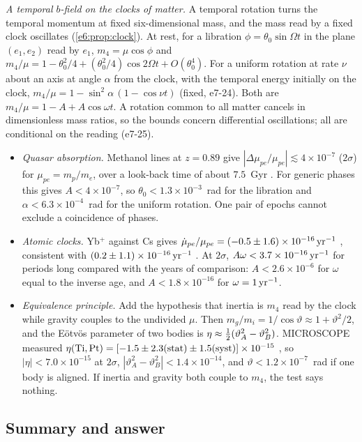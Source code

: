 \emph{A temporal $b$-field on the clocks of matter.} A temporal rotation turns the temporal momentum at fixed six-dimensional mass, and the mass
read by a fixed clock oscillates (\cref{e6:prop:clock}). At rest, for a libration $\phi=\theta_0\sin\Omega t$ in the plane $(e_1,e_2)$ read by
$e_1$, $m_4=\mu\cos\phi$ and $m_4/\mu=1-\theta_0^2/4+(\theta_0^2/4)\cos2\Omega t+O(\theta_0^4)$. For a uniform rotation at rate $\nu$ about an axis at
angle $\alpha$ from the clock, with the temporal energy initially on the clock, $m_4/\mu=1-\sin^2\alpha\,(1-\cos\nu t)$ (fixed, e7-24). Both are
$m_4/\mu=1-A+A\cos\omega t$. A rotation common to all matter cancels in dimensionless mass ratios, so the bounds concern differential
oscillations; all are conditional on the reading (e7-25).
\begin{itemize}
\item \emph{Quasar absorption.} Methanol lines at $z=0.89$ give $|\Delta\mu_{pe}/\mu_{pe}|\lesssim4\times10^{-7}$ ($2\sigma$) for
$\mu_{pe}=m_p/m_e$, over a look-back time of about $7.5$~Gyr \cite{Kanekar15}. For generic phases this gives $A<4\times10^{-7}$, so
$\theta_0<1.3\times10^{-3}$~rad for the libration and $\alpha<6.3\times10^{-4}$~rad for the uniform rotation. One pair of epochs cannot exclude a
coincidence of phases.
\item \emph{Atomic clocks.} Yb$^+$ against Cs gives $\dot\mu_{pe}/\mu_{pe}=(-0.5\pm1.6)\times10^{-16}\,{\rm yr^{-1}}$ \cite{Huntemann14}, consistent with
$(0.2\pm1.1)\times10^{-16}\,{\rm yr^{-1}}$ \cite{Godun14}. At $2\sigma$, $A\omega<3.7\times10^{-16}\,{\rm yr^{-1}}$ for periods long compared with the
years of comparison: $A<2.6\times10^{-6}$ for $\omega$ equal to the inverse age, and $A<1.8\times10^{-16}$ for $\omega=1\,{\rm yr^{-1}}$.
\item \emph{Equivalence principle.} Add the hypothesis that inertia is $m_4$ read by the clock while gravity couples to the undivided $\mu$. Then
$m_g/m_i=1/\cos\vartheta\approx1+\vartheta^2/2$, and the E\"otv\"os parameter of two bodies is $\eta\approx\tfrac12(\vartheta_A^2-\vartheta_B^2)$.
MICROSCOPE measured $\eta({\rm Ti},{\rm Pt})=[-1.5\pm2.3({\rm stat})\pm1.5({\rm syst})]\times10^{-15}$ \cite{Touboul22}, so $|\eta|<7.0\times10^{-15}$
at $2\sigma$, $|\vartheta_A^2-\vartheta_B^2|<1.4\times10^{-14}$, and $\vartheta<1.2\times10^{-7}$~rad if one body is aligned. If inertia and gravity
both couple to $m_4$, the test says nothing.
\end{itemize}

\subsection{Summary and answer}
\label{e7:sec:summary}

